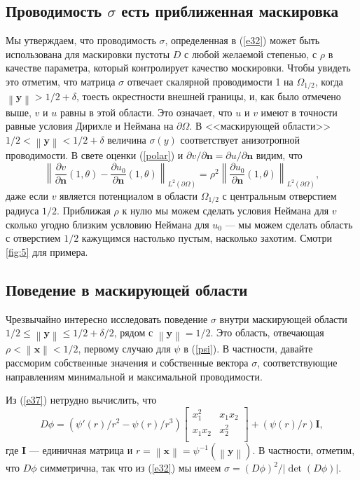 \documentclass[a4paper, 12pt]{article}
\newcommand{\norm}[1]{\left\lVert#1\right\rVert}
\newcommand{\normb}[1]{\left\lVert\textbf{#1}\right\rVert}
\begin{document}
\subsection{Проводимость $\sigma$ есть приближенная маскировка}
Мы утверждаем, что проводимость $\sigma$, определенная в (\ref{e32}) может быть 
использована для маскировки пустоты $D$ с любой желаемой степенью, с $\rho$ в 
качестве параметра, который контролирует качество москировки. Чтобы увидеть это
отметим, что матрица $\sigma$ отвечает скалярной проводимости 1 на $\Omega_{1/2}$,
когда $\normb{y} > 1/2 + \delta$, тоесть окрестности внешней границы,
и, как было отмечено выше, $v$ и $u$ равны в этой области. Это означает, что 
$u$ и $v$ имеют в точности равные условия Дирихле и Неймана на $\partial \Omega$.
В <<маскирующей области>> $1/2 < \normb{y} < 1/2 + \delta$ величина
$\sigma(y)$ соответствует анизотропной проводимости. В свете оценки (\ref{polar})
и $\partial v/\partial \textbf{n} = \partial u/\partial \textbf{n}$ видим, что
\begin{equation}
\norm{\frac{\partial v}{\partial \textbf{n}}(1,\theta) - \frac{\partial u_0}
{\partial \textbf{n}}(1, \theta)}_{L^2(\partial \Omega)} = \rho^2 
\norm{\frac{\partial u_0}
{\partial \textbf{n}}(1, \theta)}_{L^2(\partial \Omega)},
\end{equation}
даже если $v$ является потенциалом в области $\Omega_{1/2}$ с центральным отверстием
радиуса $1/2$. Приближая $\rho$ к нулю мы можем сделать условия Неймана для $v$
сколько угодно близким усвловию Неймана для $u_0$ --- мы можем сделать область с
отверстием $1/2$ кажущимся настолько пустым, насколько захотим. Смотри \ref{fig:5}
для примера.
\subsection{Поведение в маскирующей области}
Чрезвычайно интересно исследовать поведение $\sigma$ внутри маскирующей области
$1/2 \le \normb{y} \le 1/2 + \delta/2$, рядом с $\normb{y} = 1/2$.
Это область, отвечающая $\rho < \normb{x} < 1/2$, первому случаю для $\psi$
в (\ref{psi}). В частности, давайте рассморим собственные значения и собственные
вектора $\sigma$, соответствующие направлениям минимальной и максимальной 
проводимости.

Из (\ref{e37}) нетрудно вычислить, что 
\begin{equation}\label{Dphi}
D\phi = (\psi'(r)/r^2-\psi(r)/r^3)
\begin{bmatrix}
  x_1^2 & x_1x_2  \\
  x_1x_2 & x_2^2	  \\
 \end{bmatrix}
 +(\psi(r)/r)\textbf{I},
\end{equation}
где $\textbf{I}$ --- единичная матрица и $r = \normb{x} = 
\psi^{-1}(\normb{y})$. В частности, отметим, что $D\phi$ симметрична, так что
из (\ref{e32}) мы имеем $\sigma = (D\phi)^2/|\det(D\phi)|$.
\end{document}
